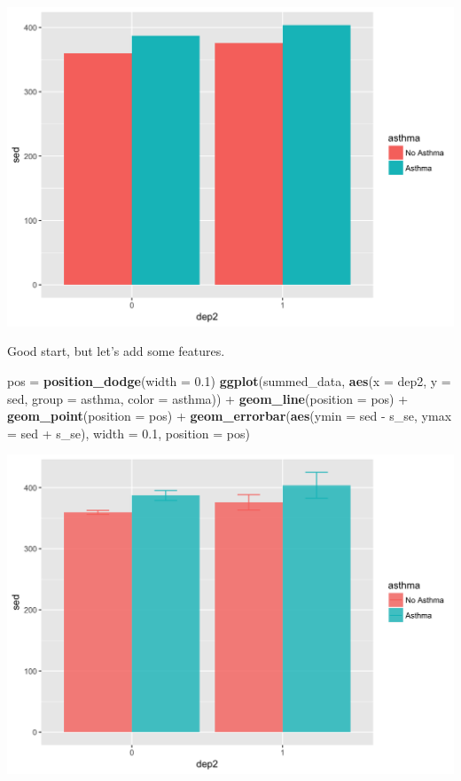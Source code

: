 \documentclass[]{tufte-book}
\newenvironment{Shaded}{}{}
\newcommand{\KeywordTok}[1]{\textcolor[rgb]{0.00,0.44,0.13}{\textbf{#1}}}
\newcommand{\DataTypeTok}[1]{\textcolor[rgb]{0.56,0.13,0.00}{#1}}
\newcommand{\FloatTok}[1]{\textcolor[rgb]{0.25,0.63,0.44}{#1}}
\newcommand{\StringTok}[1]{\textcolor[rgb]{0.25,0.44,0.63}{#1}}
\newcommand{\OperatorTok}[1]{\textcolor[rgb]{0.40,0.40,0.40}{#1}}
\newcommand{\NormalTok}[1]{#1}
\theoremstyle{definition}
\theoremstyle{definition}
\theoremstyle{remark}
\begin{document}
\includegraphics{_main_files/figure-latex/unnamed-chunk-140-1}

Good start, but let's add some features.

\begin{Shaded}
\begin{Highlighting}[]
\NormalTok{pos =}\StringTok{ }\KeywordTok{position_dodge}\NormalTok{(}\DataTypeTok{width =} \FloatTok{0.1}\NormalTok{)}
\KeywordTok{ggplot}\NormalTok{(summed_data, }\KeywordTok{aes}\NormalTok{(}\DataTypeTok{x =}\NormalTok{ dep2, }\DataTypeTok{y =}\NormalTok{ sed, }\DataTypeTok{group =}\NormalTok{ asthma, }
    \DataTypeTok{color =}\NormalTok{ asthma)) }\OperatorTok{+}\StringTok{ }\KeywordTok{geom_line}\NormalTok{(}\DataTypeTok{position =}\NormalTok{ pos) }\OperatorTok{+}\StringTok{ }
\StringTok{    }\KeywordTok{geom_point}\NormalTok{(}\DataTypeTok{position =}\NormalTok{ pos) }\OperatorTok{+}\StringTok{ }\KeywordTok{geom_errorbar}\NormalTok{(}\KeywordTok{aes}\NormalTok{(}\DataTypeTok{ymin =}\NormalTok{ sed }\OperatorTok{-}\StringTok{ }
\StringTok{    }\NormalTok{s_se, }\DataTypeTok{ymax =}\NormalTok{ sed }\OperatorTok{+}\StringTok{ }\NormalTok{s_se), }\DataTypeTok{width =} \FloatTok{0.1}\NormalTok{, }\DataTypeTok{position =}\NormalTok{ pos)}
\end{Highlighting}
\end{Shaded}

\includegraphics{_main_files/figure-latex/unnamed-chunk-141-1}
\end{document}

